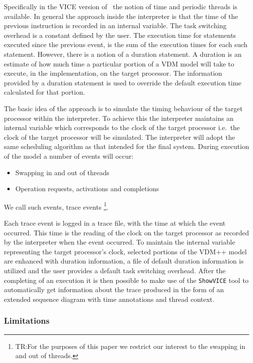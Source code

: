 Specifically in the VICE version of \vdmtools\ the notion of time and
periodic threads is available. 
In general the approach inside the interpreter is that the time of the
previous instruction is recorded in an internal variable. The task
switching overhead is a constant defined by the user. The
execution time for statements executed since the previous event, is
the sum of the execution times for each such statement. 
However, there is a notion of a duration statement.
A duration is an estimate of how much time a particular portion of a
VDM model will take to execute, in the implementation, on the target
processor. The information provided by a duration statement is
used to override the default execution time calculated for that
portion. 

The basic idea of the approach is to simulate the timing behaviour of
the target processor within the interpreter. To achieve
this the interpreter maintains an internal variable which
corresponds to the clock of the target processor i.e.\ the clock of the
target processor will be simulated. The interpreter will adopt the
same scheduling algorithm as that intended for the final system. During
execution of the model a number of events will occur: 
\begin{itemize}
\item Swapping in and out of threads
\item Operation requests, activations and completions
\end{itemize}
We call such events, trace events 
\footnote{\textsc{TR:}For the purposes of this paper we
restrict our interest to the swapping in and out of threads.}.

Each trace event is logged in a trace file, with the time at which the
event occurred. This time is the reading of the clock on the target
processor as recorded by the interpreter when the event occurred. To
maintain the internal variable representing the target processor's
clock, selected portions of the VDM++ model are enhanced with duration
information, a file of default duration information is utilized and
the user provides a default task switching overhead. After the
completing of an execution it is then possible to make use of the
\texttt{ShowVICE} tool to automatically get information about the trace
produced in the form of an extended sequence diagram with time annotations
and thread context.

\subsubsection{Limitations}

